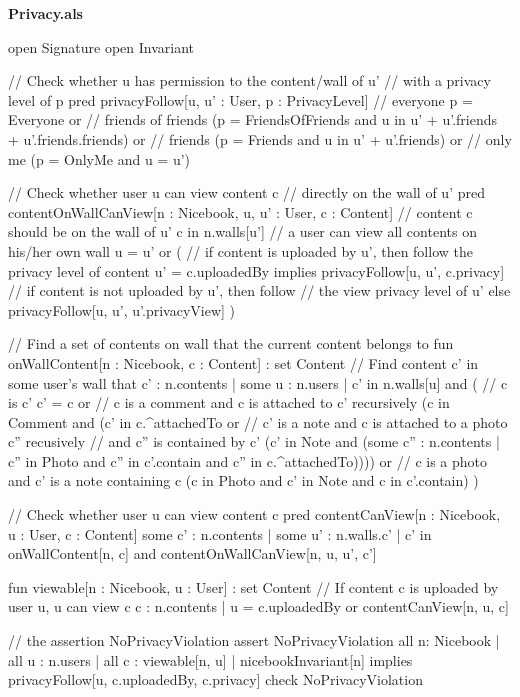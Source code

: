\documentclass[titlepage]{article}
\begin{document}
{\bf\large Privacy.als}
\begin{alloy}
open Signature
open Invariant

// Check whether u has permission to the content/wall of u'
// with a privacy level of p
pred privacyFollow[u, u' : User, p : PrivacyLevel] {
    // everyone
    p = Everyone or 
    // friends of friends
    (p = FriendsOfFriends and u in u' + u'.friends + u'.friends.friends) or
    // friends
    (p = Friends and u in u' + u'.friends) or
    // only me
    (p = OnlyMe and u = u')
}

// Check whether user u can view content c
// directly on the wall of u'
pred contentOnWallCanView[n : Nicebook, u, u' : User, c : Content] {
    // content c should be on the wall of u'
    c in n.walls[u']
    // a user can view all contents on his/her own wall
    u = u' or (
        // if content is uploaded by u', then follow the privacy level of content
        u' = c.uploadedBy implies privacyFollow[u, u', c.privacy]
        // if content is not uploaded by u', then follow
        // the view privacy level of u'
            else privacyFollow[u, u', u'.privacyView]
    )
}

// Find a set of contents on wall that the current content belongs to
fun onWallContent[n : Nicebook, c : Content] : set Content {
    // Find content c' in some user's wall that
    {c' : n.contents | some u : n.users | c' in n.walls[u] and (
        // c is c'
        c' = c or
        // c is a comment and c is attached to c' recursively
        (c in Comment and (c' in c.^attachedTo or 
            // c' is a note and c is attached to a photo c'' recusively
            // and c'' is contained by c'
            (c' in Note and (some c'' : n.contents | 
                c'' in Photo and c'' in c'.contain and c'' in c.^attachedTo)))) or
        // c is a photo and c' is a note containing c
        (c in Photo and c' in Note and c in c'.contain)
    )}
}

// Check whether user u can view content c
pred contentCanView[n : Nicebook, u : User, c : Content] {
    some c' : n.contents | some u' : n.walls.c' | 
        c' in onWallContent[n, c] and contentOnWallCanView[n, u, u', c']
}

fun viewable[n : Nicebook, u : User] : set Content {
    // If content c is uploaded by user u, u can view c
    {c : n.contents | u = c.uploadedBy or contentCanView[n, u, c]}	
}

// the assertion NoPrivacyViolation
assert NoPrivacyViolation {
    all n: Nicebook | all u : n.users | all c : viewable[n, u] |
        nicebookInvariant[n] implies privacyFollow[u, c.uploadedBy, c.privacy]
}
check NoPrivacyViolation 
\end{alloy}
\end{document}
